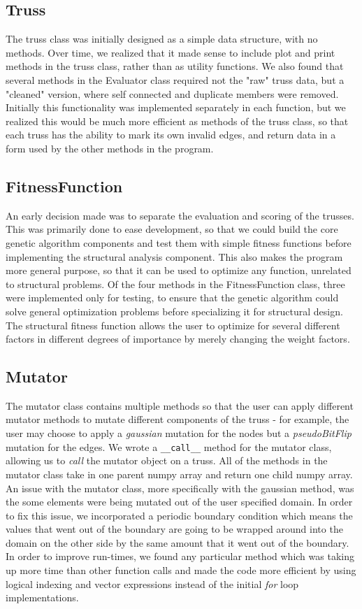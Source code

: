 \documentclass{article}
\begin{document}
\subsection{Truss}
The truss class was initially designed as a simple data structure, with no methods. Over time, we realized that it made sense to include
plot and print methods in the truss class, rather than as utility functions. We also found that several methods in the Evaluator class
required not the "raw" truss data, but a "cleaned" version, where self connected and duplicate members were removed. Initially this functionality
was implemented separately in each function, but we realized this would be much more efficient as methods of the truss class, so that
each truss has the ability to mark its own invalid edges, and return data in a form used by the other methods in the program.
\subsection{FitnessFunction}
An early decision made was to separate the evaluation and scoring of the trusses. This was primarily done to ease development,
so that we could build the core genetic algorithm components and test them with simple fitness functions before implementing the structural
analysis component. This also makes the program more general purpose, so that it can be used to optimize any function, unrelated to structural
problems. Of the four methods in the FitnessFunction class, three were implemented only for testing, to ensure that the genetic algorithm
could solve general optimization problems before specializing it for structural design. The structural fitness function allows the user
to optimize for several different factors in different degrees of importance by merely changing the weight factors.

\subsection{Mutator}
The mutator class contains multiple methods so that the user can apply different
mutator methods to mutate different components of the truss - for example, the
user may choose to apply a \textit{gaussian} mutation for the nodes but a \textit{pseudoBitFlip}
mutation for the edges. We wrote a \texttt{\_\_call\_\_} method for the mutator class, allowing
us to \textit{call} the mutator object on a truss. All of the methods in the mutator class
take in one parent numpy array and return one child numpy array. An issue with the
mutator class, more specifically with the gaussian method, was the some elements
were being mutated out of the user specified domain. In order to fix this issue,
we incorporated a periodic boundary condition which means the values that went
out of the boundary are going to be wrapped around into the domain on the other side
by the same amount that it went out of the boundary. In order to improve run-times,
we found any particular method which was taking up more time than other function calls
and made the code more efficient by using logical indexing and vector expressions
instead of the initial \textit{for} loop implementations.
\end{document}

